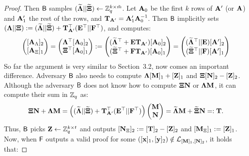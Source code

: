 \begin{proof}
Then $\mathsf{B}$ samples $(\widetilde{\mathbf{{\Lambda}}}||\widetilde{\mathbf{{\Xi}}}) \gets \mathbb{Z}_q^{k \times \tilde{m}}$.  Let $\mathbf{{A}}_0$ be the first $k$ rows of $\mathbf{{A}}'$ (or $\mathbf{{A}}$) and $\mathbf{{A}}_1'$ the rest of the rows, and $\mathbf{{T}}_{\mathbf{{A}}'}=\mathbf{{A}}'_1 \mathbf{{A}}_0^{-1}$. Then $\mathsf{B}$ implicitly sets 
$(\mathbf{{\Lambda}} || \mathbf{{\Xi}}):= (\widetilde{\mathbf{{\Lambda}}} || \widetilde{\mathbf{{\Xi}}})+ \mathbf{{T}}^{\top}_{\mathbf{{A}}'} (\mathbf{{E}}^{\top} || \mathbf{{F}}^{\top})$, and computes:
\begin{equation}
\begin{pmatrix}
[\matrA_{\Lambda}]_2\\
[\matrA_{\Xi}]_1
\end{pmatrix}=
\begin{pmatrix}
\matr{\Lambda}^{\top} [\matrA_0]_2\\
\matr{\Xi}^{\top} [\matrA_0]_1
\end{pmatrix}:=
\begin{pmatrix}
(\widetilde{\matr{\Lambda}}^{\top}+ \matr{E} \matr{T}_{\matrA'}) [\matrA_0]_2 \\
(\widetilde{\matr{\Xi}}^{\top}+ \matr{F} \matr{T}_{\matrA'}) [\matrA_0]_1
\end{pmatrix}
=
\begin{pmatrix}
(\widetilde{\matr{\Lambda}}^{\top}|| \matr{E}) [\matrA']_2 \\
(\widetilde{\matr{\Xi}}^{\top}|| \matr{F} ) [\matrA']_1
\end{pmatrix}
\end{equation}
So far the argument is very similar to \cite{EC:KilWee15} Section~3.2, now comes an important difference. 
Adversary $\mathsf{B}$ also needs to compute $\mathbf{{\Lambda}}[\mathbf{{M}}]_1+[\mathbf{{Z}}]_1$ and 
$\mathbf{{\Xi}}[\mathbf{{N}}]_2-[\mathbf{{Z}}]_2$. Although the adversary $\mathsf{B}$ does not know how to 
compute $\mathbf{{\Xi}}\mathbf{{N}}$ or $\mathbf{{\Lambda}}\mathbf{{M}}$, it can compute their sum in $\mathbb{Z}_q$ as:
 $$\mathbf{{\Xi}}\mathbf{{N}}+\mathbf{{\Lambda}}\mathbf{{M}}=
    \left(
        (\widetilde{\mathbf{{\Lambda}}} || \widetilde{\mathbf{{\Xi}}})
        + \mathbf{{T}}^{\top}_{\mathbf{{A}}'}(\mathbf{{E}}^{\top}||\mathbf{{F}}^{\top})
    \right)
 \begin{pmatrix}
    \mathbf{{M}} \\ \mathbf{{N}}
 \end{pmatrix} =\widetilde{\mathbf{{\Lambda}}} \mathbf{{M}}+\widetilde{\mathbf{{\Xi}}} \mathbf{{N}}=:\mathbf{{T}}.  
 $$
Thus, $\mathsf{B}$ picks $\mathbf{{Z}} \gets \mathbb{Z}_q^{k \times t}$ and outputs 
$[\mathbf{{N}}_{\Xi}]_2:=[\mathbf{{T}}]_2-[\mathbf{{Z}}]_2$ and  $[\mathbf{{M}}_{\Xi}]_1:=[\mathbf{{Z}}]_1$.
Now, when $\mathsf{F}$ outputs a valid proof for some $([\mathbf{x}]_1,[\mathbf{y}]_2) \notin \mathcal{L}_{[\mathbf{{M}}]_1,[\mathbf{{N}}]_2}$, it holds that:

\end{proof}

